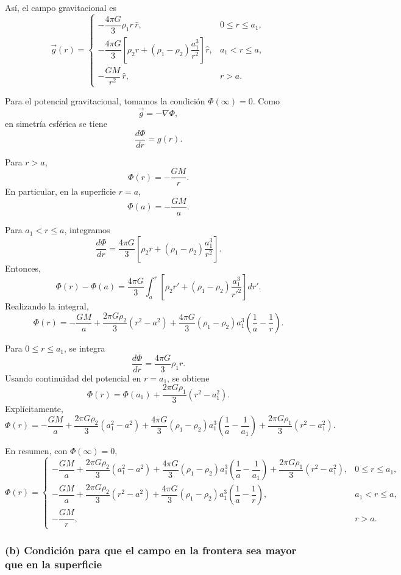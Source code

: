 \documentclass[a4paper]{article}
\begin{document}
Así, el campo gravitacional es
$$
\vec g(r)=
\left\{
\begin{array}{ll}
-\dfrac{4\pi G}{3}\rho_1 r\,\hat r, & 0\le r\le a_1,\\[3mm]
-\dfrac{4\pi G}{3}\left[\rho_2 r+(\rho_1-\rho_2)\dfrac{a_1^3}{r^2}\right]\hat r, & a_1<r\le a,\\[4mm]
-\dfrac{GM}{r^2}\,\hat r, & r>a.
\end{array}
\right.
$$

Para el potencial gravitacional, tomamos la condición $\Phi(\infty)=0$. Como
$$
\vec g=-\nabla\Phi,
$$
en simetría esférica se tiene
$$
\frac{d\Phi}{dr}=g(r).
$$

Para $r>a$,
$$
\Phi(r)=-\frac{GM}{r}.
$$
En particular, en la superficie $r=a$,
$$
\Phi(a)=-\frac{GM}{a}.
$$

Para $a_1<r\le a$, integramos
$$
\frac{d\Phi}{dr}
=\frac{4\pi G}{3}\left[\rho_2 r+(\rho_1-\rho_2)\frac{a_1^3}{r^2}\right].
$$
Entonces,
$$
\Phi(r)-\Phi(a)
=
\frac{4\pi G}{3}
\int_a^r
\left[
\rho_2 r'
+(\rho_1-\rho_2)\frac{a_1^3}{r'^2}
\right]dr'.
$$
Realizando la integral,
$$
\Phi(r)=
-\frac{GM}{a}
+\frac{2\pi G\rho_2}{3}(r^2-a^2)
+\frac{4\pi G}{3}(\rho_1-\rho_2)a_1^3
\left(\frac{1}{a}-\frac{1}{r}\right).
$$

Para $0\le r\le a_1$, se integra
$$
\frac{d\Phi}{dr}=\frac{4\pi G}{3}\rho_1 r.
$$
Usando continuidad del potencial en $r=a_1$, se obtiene
$$
\Phi(r)=\Phi(a_1)+\frac{2\pi G\rho_1}{3}(r^2-a_1^2).
$$
Explícitamente,
$$
\Phi(r)=
-\frac{GM}{a}
+\frac{2\pi G\rho_2}{3}(a_1^2-a^2)
+\frac{4\pi G}{3}(\rho_1-\rho_2)a_1^3
\left(\frac{1}{a}-\frac{1}{a_1}\right)
+\frac{2\pi G\rho_1}{3}(r^2-a_1^2).
$$

En resumen, con $\Phi(\infty)=0$,
$$
\Phi(r)=
\left\{
\begin{array}{ll}
-\dfrac{GM}{a}
+\dfrac{2\pi G\rho_2}{3}(a_1^2-a^2)
+\dfrac{4\pi G}{3}(\rho_1-\rho_2)a_1^3
\left(\dfrac{1}{a}-\dfrac{1}{a_1}\right)
+\dfrac{2\pi G\rho_1}{3}(r^2-a_1^2),
& 0\le r\le a_1,\\[5mm]
-\dfrac{GM}{a}
+\dfrac{2\pi G\rho_2}{3}(r^2-a^2)
+\dfrac{4\pi G}{3}(\rho_1-\rho_2)a_1^3
\left(\dfrac{1}{a}-\dfrac{1}{r}\right),
& a_1<r\le a,\\[5mm]
-\dfrac{GM}{r}, & r>a.
\end{array}
\right.
$$

\subsubsection{(b) Condición para que el campo en la frontera sea mayor que en la superficie}
\end{document}
